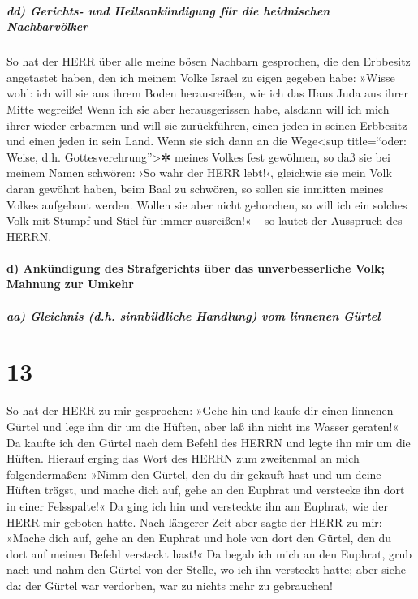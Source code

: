 \hypertarget{dd-gerichts--und-heilsankuxfcndigung-fuxfcr-die-heidnischen-nachbarvuxf6lker}{%
\subparagraph{dd) Gerichts- und Heilsankündigung für die heidnischen
Nachbarvölker}\label{dd-gerichts--und-heilsankuxfcndigung-fuxfcr-die-heidnischen-nachbarvuxf6lker}}

So hat der HERR über alle meine bösen Nachbarn
gesprochen, die den Erbbesitz angetastet haben, den ich meinem Volke
Israel zu eigen gegeben habe: »Wisse wohl: ich will sie aus ihrem Boden
herausreißen, wie ich das Haus Juda aus ihrer Mitte wegreiße!
Wenn ich sie aber herausgerissen habe, alsdann will ich
mich ihrer wieder erbarmen und will sie zurückführen, einen jeden in
seinen Erbbesitz und einen jeden in sein Land. Wenn sie
sich dann an die Wege\textless sup title=``oder: Weise, d.h.
Gottesverehrung''\textgreater✲ meines Volkes fest gewöhnen, so daß sie
bei meinem Namen schwören: ›So wahr der HERR lebt!‹, gleichwie sie mein
Volk daran gewöhnt haben, beim Baal zu schwören, so sollen sie inmitten
meines Volkes aufgebaut werden. Wollen sie aber nicht
gehorchen, so will ich ein solches Volk mit Stumpf und Stiel für immer
ausreißen!« -- so lautet der Ausspruch des HERRN.

\hypertarget{d-ankuxfcndigung-des-strafgerichts-uxfcber-das-unverbesserliche-volk-mahnung-zur-umkehr}{%
\paragraph{d) Ankündigung des Strafgerichts über das unverbesserliche
Volk; Mahnung zur
Umkehr}\label{d-ankuxfcndigung-des-strafgerichts-uxfcber-das-unverbesserliche-volk-mahnung-zur-umkehr}}

\hypertarget{aa-gleichnis-d.h.-sinnbildliche-handlung-vom-linnenen-guxfcrtel}{%
\subparagraph{aa) Gleichnis (d.h. sinnbildliche Handlung) vom linnenen
Gürtel}\label{aa-gleichnis-d.h.-sinnbildliche-handlung-vom-linnenen-guxfcrtel}}

\hypertarget{section-12}{%
\section{13}\label{section-12}}

So hat der HERR zu mir gesprochen: »Gehe hin und kaufe dir
einen linnenen Gürtel und lege ihn dir um die Hüften, aber laß ihn nicht
ins Wasser geraten!« Da kaufte ich den Gürtel nach dem
Befehl des HERRN und legte ihn mir um die Hüften. Hierauf
erging das Wort des HERRN zum zweitenmal an mich folgendermaßen:
»Nimm den Gürtel, den du dir gekauft hast und um deine
Hüften trägst, und mache dich auf, gehe an den Euphrat und verstecke ihn
dort in einer Felsspalte!« Da ging ich hin und versteckte
ihn am Euphrat, wie der HERR mir geboten hatte. Nach
längerer Zeit aber sagte der HERR zu mir: »Mache dich auf, gehe an den
Euphrat und hole von dort den Gürtel, den du dort auf meinen Befehl
versteckt hast!« Da begab ich mich an den Euphrat, grub
nach und nahm den Gürtel von der Stelle, wo ich ihn versteckt hatte;
aber siehe da: der Gürtel war verdorben, war zu nichts mehr zu
gebrauchen!

